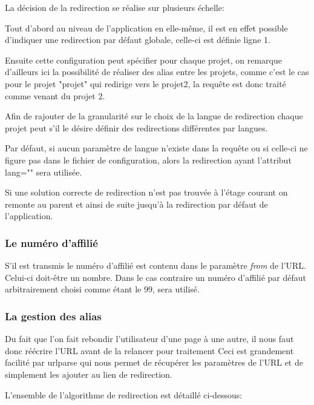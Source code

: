 La décision de la redirection se réalise sur plusieurs échelle:

Tout d'abord au niveau de l'application en elle-même, il est en effet possible d'indiquer une redirection par défaut globale, celle-ci est définie ligne 1.

Ensuite cette configuration peut spécifier pour chaque projet, on remarque d'ailleurs ici la possibilité de réaliser des alias entre les projets, comme c'est le cas pour le projet "projet" qui redirige vers le projet2, la requête est donc traité comme venant du projet 2.

Afin de rajouter de la granularité sur le choix de la langue de redirection chaque projet peut s'il le désire définir des redirections différentes par langues.

Par défaut, si aucun paramètre de langue n'existe dans la requête ou si celle-ci ne figure pas dans le fichier de configuration, alors la redirection ayant l'attribut lang="" sera utilisée.

Si une solution correcte de redirection n'est pas trouvée à l'étage courant on remonte au parent et ainsi de suite jusqu'à la redirection par défaut de l'application.


\subsubsection*{Le numéro d'affilié}

S'il est transmis le numéro d'affilié est contenu dans le paramètre \textit{from} de l'URL. Celui-ci doit-être un nombre. Dans le cas contraire un numéro d'affilié par défaut arbitrairement choisi comme étant le 99, sera  utilisé.

\subsubsection*{La gestion des alias}
Du fait que l'on fait rebondir l'utilisateur d'une page à une autre, il nous faut donc réécrire l'URL avant de la relancer pour traitement
Ceci est grandement facilité par urlparse qui nous permet de récupérer les paramètres de l'URL et de simplement les ajouter au lien de redirection.

\newpage

L'ensemble de l'algorithme de redirection est détaillé ci-dessous:

